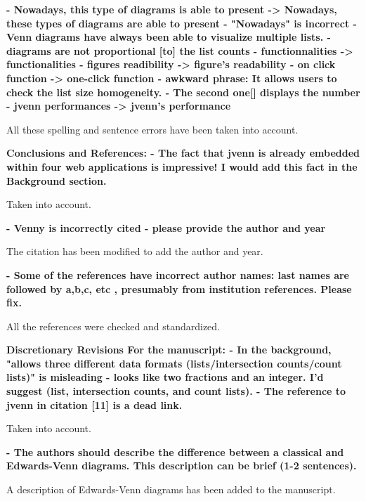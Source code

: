 \documentclass[10pt,stdletter,dateno,sigleft]{newlfm} %
\begin{document}
\begin{newlfm}
\textbf{- Nowadays, this type of diagrams is able to present -> Nowadays,
these types of diagrams are able to present\newline
- "Nowadays" is incorrect - Venn diagrams have always been
able to visualize multiple lists.\newline
- diagrams are not proportional [to] the list counts\newline
- functionnalities -> functionalities\newline
- figures readibility -> figure's readability\newline
- on click function -> one-click function\newline
- awkward phrase: It allows users to check the list size homogeneity.\newline
- The second one[] displays the number\newline
- jvenn performances -> jvenn's performance\newline}

All these spelling and sentence errors have been taken into account.

\textbf{Conclusions and References:\newline
- The fact that jvenn is already embedded within four web applications
is impressive! I would add this fact in the Background section.}

Taken into account.

\textbf{- Venny is incorrectly cited - please provide the author and year}

The citation has been modified to add the author and year.

\textbf{- Some of the references have incorrect author names: last names are
followed by a,b,c, etc , presumably from institution references. Please fix.}

All the references were checked and standardized.

\textbf{Discretionary Revisions
For the manuscript:
- In the background, "allows three different data formats
(lists/intersection counts/count lists)" is misleading - looks like
two fractions and an integer. I'd suggest (list, intersection counts,
and count lists).
- The reference to jvenn in citation [11] is a dead link.}

Taken into account.

\textbf{- The authors should describe the difference between a classical and
Edwards-Venn diagrams. This description can be brief (1-2 sentences).}

A description of Edwards-Venn diagrams has been added to the manuscript. 


\end{newlfm}
\end{document}
